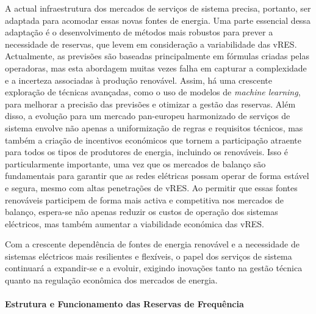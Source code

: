 A actual infraestrutura dos mercados de serviços de sistema precisa, portanto, ser adaptada para acomodar essas novas fontes de energia. Uma parte essencial dessa adaptação é o desenvolvimento de métodos mais robustos para prever a necessidade de reservas, que levem em consideração a variabilidade das \gls{vRES}. Actualmente, as previsões são baseadas principalmente em fórmulas criadas pelas operadoras, mas esta abordagem muitas vezes falha em capturar a complexidade e a incerteza associadas à produção renovável. Assim, há uma crescente exploração de técnicas avançadas, como o uso de modelos de \textit{machine learning}, para melhorar a precisão das previsões e otimizar a gestão das reservas.
Além disso, a evolução para um mercado pan-europeu harmonizado de serviços de sistema envolve não apenas a uniformização de regras e requisitos técnicos, mas também a criação de incentivos económicos que tornem a participação atraente para todos os tipos de produtores de energia, incluindo os renováveis. Isso é particularmente importante, uma vez que os mercados de balanço são fundamentais para garantir que as redes elétricas possam operar de forma estável e segura, mesmo com altas penetrações de \gls{vRES}. Ao permitir que essas fontes renováveis participem de forma mais activa e competitiva nos mercados de balanço, espera-se não apenas reduzir os custos de operação dos sistemas eléctricos, mas também aumentar a viabilidade económica das \gls{vRES}.\par
Com a crescente dependência de fontes de energia renovável e a necessidade de sistemas eléctricos mais resilientes e flexíveis, o papel dos serviços de sistema continuará a expandir-se e a evoluir, exigindo inovações tanto na gestão técnica quanto na regulação econômica dos mercados de energia.\par


\paragraph{Estrutura e Funcionamento das Reservas de Frequência \label{se:reservas_freq}}
\text{ }  \par


